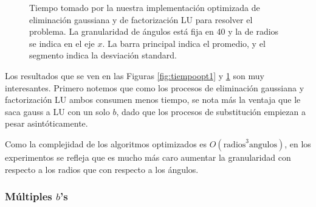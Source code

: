 \begin{figure}[H]
\begin{minipage}{0.48\textwidth}
  \caption{\footnotesize{Tiempo tomado por la nuestra implementación optimizada de eliminación gaussiana y de factorización LU para resolver el problema. La granularidad de ángulos está fija en 40 y la de radios se indica en el eje $x$. La barra principal indica el promedio, y el segmento indica la desviación standard.}}
  \label{fig:tiempoopt2}
\end{minipage}
\end{figure}


Los resultados que se ven en las Figuras \ref{fig:tiempoopt1} y \ref{fig:tiempoopt2} son muy interesantes. Primero notemos que como los procesos de eliminación gaussiana y factorización LU ambos consumen menos tiempo, se nota más la ventaja que le saca gauss a LU con un solo $b$, dado que los procesos de substitución empiezan a pesar asintóticamente.


Como la complejidad de los algoritmos optimizados es $O(\text{radios}^3   \text{angulos})$, en los experimentos se refleja que es mucho más caro aumentar la granularidad con respecto a los radios que con respecto a los ángulos.

\subsubsection{Múltiples $b$'s}



